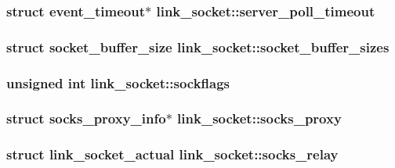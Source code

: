 \subsubsection[{server\+\_\+poll\+\_\+timeout}]{\setlength{\rightskip}{0pt plus 5cm}struct {\bf event\+\_\+timeout}$\ast$ link\+\_\+socket\+::server\+\_\+poll\+\_\+timeout}\label{structlink__socket_a06d1a16c1d6372443d7e51c1d2e45a23}
\hypertarget{structlink__socket_a30f2a6730a458002824a902bdff9b539}{}
\subsubsection[{socket\+\_\+buffer\+\_\+sizes}]{\setlength{\rightskip}{0pt plus 5cm}struct {\bf socket\+\_\+buffer\+\_\+size} link\+\_\+socket\+::socket\+\_\+buffer\+\_\+sizes}\label{structlink__socket_a30f2a6730a458002824a902bdff9b539}
\hypertarget{structlink__socket_aa5cbf92dc691f9e3b1a460f1f1e290b4}{}
\subsubsection[{sockflags}]{\setlength{\rightskip}{0pt plus 5cm}unsigned int link\+\_\+socket\+::sockflags}\label{structlink__socket_aa5cbf92dc691f9e3b1a460f1f1e290b4}
\hypertarget{structlink__socket_ab8860d796d2cdcde7e2741508d219da2}{}
\subsubsection[{socks\+\_\+proxy}]{\setlength{\rightskip}{0pt plus 5cm}struct {\bf socks\+\_\+proxy\+\_\+info}$\ast$ link\+\_\+socket\+::socks\+\_\+proxy}\label{structlink__socket_ab8860d796d2cdcde7e2741508d219da2}
\hypertarget{structlink__socket_a33f63972fd440622ae822bfde852a678}{}
\subsubsection[{socks\+\_\+relay}]{\setlength{\rightskip}{0pt plus 5cm}struct {\bf link\+\_\+socket\+\_\+actual} link\+\_\+socket\+::socks\+\_\+relay}\label{structlink__socket_a33f63972fd440622ae822bfde852a678}
\hypertarget{structlink__socket_aadfcc653c136bad2c174066f4ff5b799}{}
